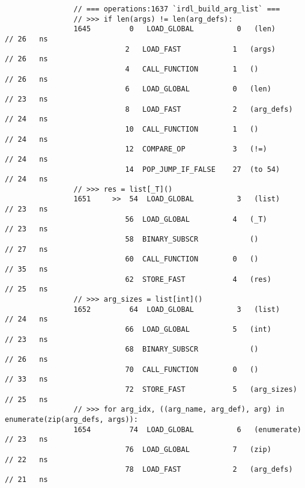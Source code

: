 \begin{code}
\begin{verbatim}
                // === operations:1637 `irdl_build_arg_list` ===
                // >>> if len(args) != len(arg_defs):
                1645         0   LOAD_GLOBAL          0   (len)                                     // 26   ns
                            2   LOAD_FAST            1   (args)                                     // 26   ns
                            4   CALL_FUNCTION        1   ()                                         // 26   ns
                            6   LOAD_GLOBAL          0   (len)                                      // 23   ns
                            8   LOAD_FAST            2   (arg_defs)                                 // 24   ns
                            10  CALL_FUNCTION        1   ()                                         // 24   ns
                            12  COMPARE_OP           3   (!=)                                       // 24   ns
                            14  POP_JUMP_IF_FALSE    27  (to 54)                                    // 24   ns
                // >>> res = list[_T]()
                1651     >>  54  LOAD_GLOBAL          3   (list)                                    // 23   ns
                            56  LOAD_GLOBAL          4   (_T)                                       // 23   ns
                            58  BINARY_SUBSCR            ()                                         // 27   ns
                            60  CALL_FUNCTION        0   ()                                         // 35   ns
                            62  STORE_FAST           4   (res)                                      // 25   ns
                // >>> arg_sizes = list[int]()
                1652         64  LOAD_GLOBAL          3   (list)                                    // 24   ns
                            66  LOAD_GLOBAL          5   (int)                                      // 23   ns
                            68  BINARY_SUBSCR            ()                                         // 26   ns
                            70  CALL_FUNCTION        0   ()                                         // 33   ns
                            72  STORE_FAST           5   (arg_sizes)                                // 25   ns
                // >>> for arg_idx, ((arg_name, arg_def), arg) in enumerate(zip(arg_defs, args)):
                1654         74  LOAD_GLOBAL          6   (enumerate)                               // 23   ns
                            76  LOAD_GLOBAL          7   (zip)                                      // 22   ns
                            78  LOAD_FAST            2   (arg_defs)                                 // 21   ns

\end{verbatim}
\end{code}
